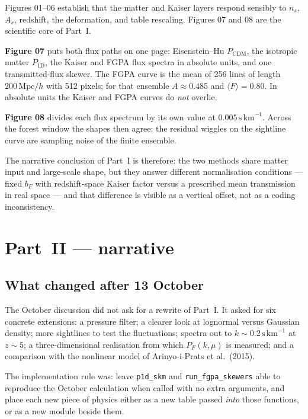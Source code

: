\documentclass[11pt]{article}
\begin{document}
Figures 01--06 establish that the matter and Kaiser layers respond sensibly to $n_s$, $A_s$, redshift, the deformation, and table rescaling.
Figures 07 and 08 are the scientific core of Part~I.

\textbf{Figure 07} puts both flux paths on one page: Eisenstein--Hu $P_\mathrm{CDM}$, the isotropic matter $P_{1\mathrm{D}}$, the Kaiser and FGPA flux spectra in absolute units, and one transmitted-flux skewer.
The FGPA curve is the mean of 256 lines of length $200\,\mathrm{Mpc}/h$ with 512 pixels; for that ensemble $A\approx 0.485$ and $\langle F\rangle=0.80$.
In absolute units the Kaiser and FGPA curves do \emph{not} overlie.

\textbf{Figure 08} divides each flux spectrum by its own value at $0.005\,\mathrm{s\,km}^{-1}$.
Across the forest window the shapes then agree; the residual wiggles on the sightline curve are sampling noise of the finite ensemble.

The narrative conclusion of Part~I is therefore:
the two methods share matter input and large-scale shape, but they answer different normalisation conditions --- fixed $b_F$ with redshift-space Kaiser factor versus a prescribed mean transmission in real space --- and that difference is visible as a vertical offset, not as a coding inconsistency.

\section{Part~II --- narrative}

\subsection{What changed after 13 October}

The October discussion did not ask for a rewrite of Part~I.
It asked for six concrete extensions: a pressure filter; a clearer look at lognormal versus Gaussian density; more sightlines to test the fluctuations; spectra out to $k\sim 0.2\,\mathrm{s\,km}^{-1}$ at $z\sim 5$; a three-dimensional realisation from which $P_F(k,\mu)$ is measured; and a comparison with the nonlinear model of Arinyo-i-Prats et al.\ (2015).

The implementation rule was: leave \texttt{p1d\_skm} and \texttt{run\_fgpa\_skewers} able to reproduce the October calculation when called with no extra arguments, and place each new piece of physics either as a new table passed \emph{into} those functions, or as a new module beside them.
\end{document}
